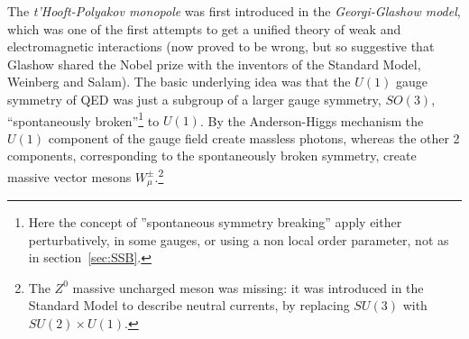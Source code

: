 \documentclass[../main/main.tex]{subfiles}
\begin{document}
The \emph{t'Hooft-Polyakov monopole} was first introduced in the \emph{Georgi-Glashow model}, which was one of the first attempts to get a unified theory of weak and electromagnetic interactions (now proved to be wrong, but so suggestive that Glashow shared the Nobel prize with the inventors of the Standard Model, Weinberg and Salam). The basic underlying idea was that the $U(1)$ gauge symmetry of QED was just a subgroup of a larger gauge symmetry, $SO(3)$, ``spontaneously broken''\footnote{Here the concept of ''spontaneous symmetry breaking'' apply either perturbatively, in some gauges, or using a non local order parameter, not as in section~\ref{sec:SSB}.} to $U(1)$. By the Anderson-Higgs mechanism the $U(1)$ component of the gauge field create massless photons, whereas the other 2 components, corresponding to the spontaneously broken symmetry, create massive vector mesons $W_\mu^\pm$.\footnote{The $Z^0$ massive uncharged meson was missing: it was introduced in the Standard Model to describe neutral currents, by replacing $SU(3)$ with $SU(2)\times U(1)$.} 


\skipline
\end{document}
